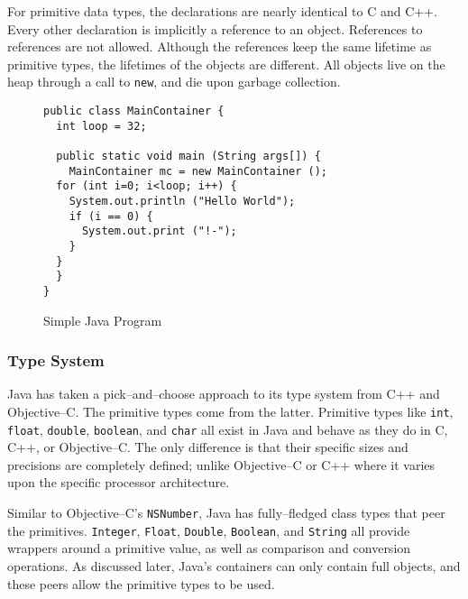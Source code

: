 For primitive data types, the declarations are nearly identical to C and C++.
Every other declaration is implicitly a reference to an object. References to
references are not allowed. Although the references keep the same lifetime as
primitive types, the lifetimes of the objects are different. All objects live
on the heap through a call to \texttt{new}, and die upon garbage collection.

\begin{figure}[ht!]
\begin{verbatim}
public class MainContainer {
  int loop = 32;
  
  public static void main (String args[]) {
    MainContainer mc = new MainContainer ();
  for (int i=0; i<loop; i++) {
    System.out.println ("Hello World");
    if (i == 0) {
      System.out.print ("!-");
    }
  }
  }
}
\end{verbatim}
\caption{Simple Java Program}
\label{fig:java-simple}
\end{figure}


\subsubsection{Type System}

Java has taken a pick--and--choose approach to its type system from C++ and
Objective--C. The primitive types come from the latter. Primitive types like
\texttt{int}, \texttt{float}, \texttt{double}, \texttt{boolean}, and
\texttt{char} all exist in Java and behave as they do in C, C++, or
Objective--C. The only difference is that their specific sizes and precisions
are completely defined; unlike Objective--C or C++ where it varies upon the
specific processor architecture.

Similar to Objective--C's \texttt{NSNumber}, Java has fully--fledged class
types that peer the primitives. \texttt{Integer}, \texttt{Float},
\texttt{Double}, \texttt{Boolean}, and \texttt{String} all provide wrappers
around a primitive value, as well as comparison and conversion operations. As
discussed later, Java's containers can only contain full objects, and these
peers allow the primitive types to be used.


